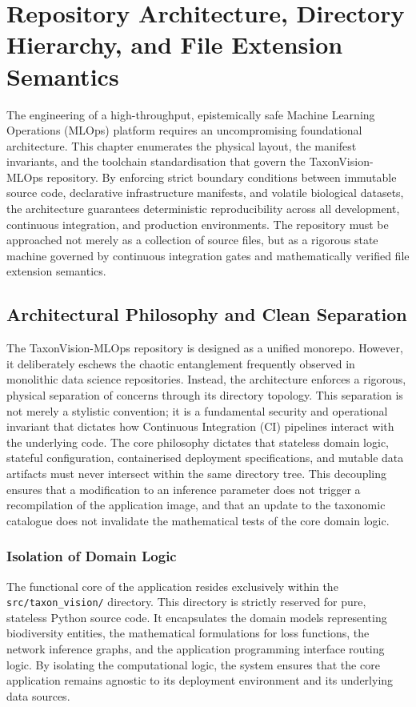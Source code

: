 \chapter{Repository Architecture, Directory Hierarchy, and File Extension Semantics}
\label{ch:repository_architecture}

The engineering of a high-throughput, epistemically safe Machine Learning Operations (MLOps) platform requires an uncompromising foundational architecture. This chapter enumerates the physical layout, the manifest invariants, and the toolchain standardisation that govern the TaxonVision-MLOps repository. By enforcing strict boundary conditions between immutable source code, declarative infrastructure manifests, and volatile biological datasets, the architecture guarantees deterministic reproducibility across all development, continuous integration, and production environments. The repository must be approached not merely as a collection of source files, but as a rigorous state machine governed by continuous integration gates and mathematically verified file extension semantics.

\section{Architectural Philosophy and Clean Separation}
\label{sec:architectural_philosophy}

The TaxonVision-MLOps repository is designed as a unified monorepo. However, it deliberately eschews the chaotic entanglement frequently observed in monolithic data science repositories. Instead, the architecture enforces a rigorous, physical separation of concerns through its directory topology. This separation is not merely a stylistic convention; it is a fundamental security and operational invariant that dictates how Continuous Integration (CI) pipelines interact with the underlying code. The core philosophy dictates that stateless domain logic, stateful configuration, containerised deployment specifications, and mutable data artifacts must never intersect within the same directory tree. This decoupling ensures that a modification to an inference parameter does not trigger a recompilation of the application image, and that an update to the taxonomic catalogue does not invalidate the mathematical tests of the core domain logic.

\subsection{Isolation of Domain Logic}
The functional core of the application resides exclusively within the \texttt{src/taxon\_vision/} directory. This directory is strictly reserved for pure, stateless Python source code. It encapsulates the domain models representing biodiversity entities, the mathematical formulations for loss functions, the network inference graphs, and the application programming interface routing logic. By isolating the computational logic, the system ensures that the core application remains agnostic to its deployment environment and its underlying data sources.

